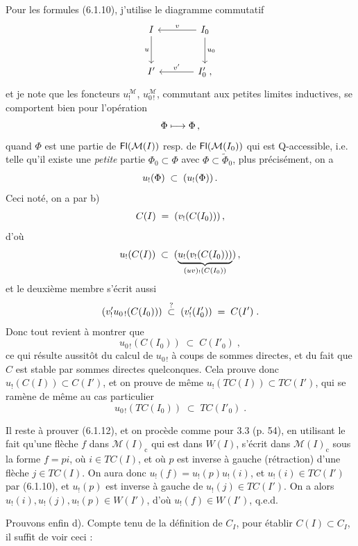 Pour les formules (6.1.10), j'utilise le diagramme commutatif
\[
\begin{tikzcd}[row sep=large, column sep=large]
I \arrow[d, "u"'] & I_0 \arrow[l, "v"'] \arrow[d, "u_0"] \\
I' & I'_0\;, \arrow[l, "v'"']
\end{tikzcd}
\]
et je note que les foncteurs $u_!^{\mathcal{M}}$, $u_{0\,!}^{\mathcal{M}}$, commutant aux petites limites inductives, se
comportent bien pour l'opération
\[
\Phi \longmapsto \Phi\tl\,,
\]
quand $\Phi$ est une partie de $\mathsf{Fl}(\mathcal{M}(I))$ resp. de $\mathsf{Fl}(\mathcal{M}(I_0))$ qui est Q-accessible, i.e. telle qu'il existe une \textit{petite} partie $\Phi_0 \subset \Phi$ avec $\Phi \subset \tilde{\Phi}_0$, plus précisément, on a
\[
u_!(\Phi\tl) \;\subset\; (u_!(\Phi))\tl\,.
\]
Ceci noté, on a par b)
\[
C(I) \;=\; (v_!(C(I_0)))\tl\,,
\]
d'où
\[
u_!(C(I)) \;\subset\; (\underbrace{u_!(v_!(C(I_0)))}_{(uv)_!(C(I_0))})\tl\,,
\]
et le deuxième membre s'écrit aussi
\[
(v'_!u_{0\,!}(C(I_0)))\tl \;\overset{?}{\subset}\; (v'_!(I'_0))\tl \;=\; C(I')\;. %
\]
Donc tout revient à montrer que
\[
u_{0\,!}(C(I_0)) \;\subset\; C(I'_0)\;,
\tag*{(6.1.16)}
\]
ce qui résulte aussitôt du calcul de $u_{0\,!}$ à coups de sommes directes, et du fait que $C$ est stable par sommes directes quelconques. Cela prouve donc $u_!(C(I)) \subset C(I')$, et on prouve de même $u_!(TC(I)) \subset TC(I')$, qui se ramène de même au cas particulier
\[
u_{0\,!}(TC(I_0)) \;\subset\; TC(I'_0)\;.
\tag*{(6.1.17)}
\]



Il reste à prouver (6.1.12), et on procède comme pour 3.3 (p. 54), en utilisant le fait qu'une flèche $f$ dans $\mathcal{M}(I)_{\mathrm{c}}$ qui est dans $W(I)$, s'écrit dans $\mathcal{M}(I)_{\mathrm{c}}$ sous la forme $f = pi$, où $i \in TC(I)$, et où $p$ est inverse à gauche (rétraction) d'une flèche $j \in TC(I)$. On aura donc $u_!(f) = u_!(p)u_!(i)$, et $u_!(i) \in TC(I')$ par (6.1.10), et $u_!(p)$ est inverse à gauche de $u_!(j) \in TC(I')$. On a alors $u_!(i), u_!(j), u_!(p) \in W(I')$, d'où $u_!(f) \in W(I')$, q.e.d.

Prouvons enfin d). Compte tenu de la définition de $C_I$, pour établir $C(I) \subset C_I$, il suffit de voir ceci :

